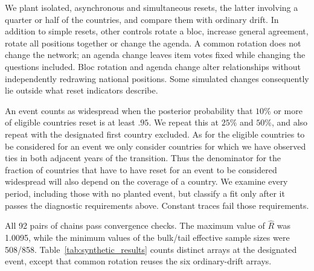 \documentclass[10pt,authoryear]{elsarticle}
\begin{document}
We plant isolated, asynchronous and simultaneous resets, the latter involving a quarter or half of the countries, and compare them with ordinary drift. In addition to simple resets, other controls rotate a bloc, increase general agreement, rotate all positions together or change the agenda. A common rotation does not change the network; an agenda change leaves item votes fixed while changing the questions included. Bloc rotation and agenda change alter relationships without independently redrawing national positions. Some simulated changes consequently lie outside what reset indicators describe.

An event counts as widespread when the posterior probability that $10\%$ or more of eligible countries reset is at least $.95$. We repeat this at $25\%$ and $50\%$, and also repeat with the designated first country excluded. As for the eligible countries to be considered for an event we only consider countries for which we have observed ties in both adjacent years of the transition. Thus the denominator for the fraction of countries that have to have reset for an event to be considered widespread will also depend on the coverage of a country. We examine every period, including those with no planted event, but classify a fit only after it passes the diagnostic requirements above. Constant traces fail those requirements.

All 92 pairs of chains pass convergence checks. The maximum value of $\widehat R$ was 1.0095, while the minimum values of the bulk/tail effective sample sizes were 508/858. Table~\ref{tab:synthetic_results} counts distinct arrays at the designated event, except that common rotation reuses the six ordinary-drift arrays.
\end{document}
